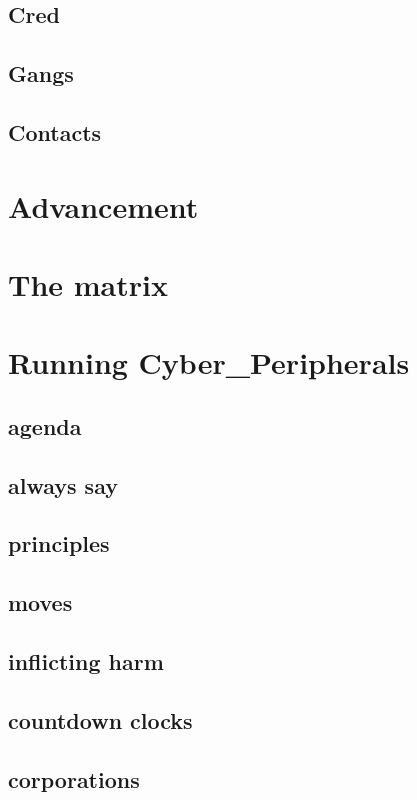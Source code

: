 \documentclass{tufte-book}
\begin{document}
\section {Cred} 	\label{sec:cred}
\section {Gangs}	\label{sec: gangs}
\section {Contacts}	\label{sec: contacts}

\chapter{Advancement}	\label{ch: advancement}
\chapter{The matrix}	\label{ch: the matrix}
\chapter{Running Cyber\_Peripherals}	\label{ch:running the game}
\section{agenda}			\label{sec: agenda}
\section{always say}		\label{sec: always say}
\section{principles}			\label{sec: principles}
\section{moves}			\label{sec: mcmoves}
\section{inflicting harm}		\label{sec:inflicting harm}
\section{countdown clocks}	\label{sec:countdown clocks}
\section{corporations} 		\label{sec: corporations}
\end{document}
